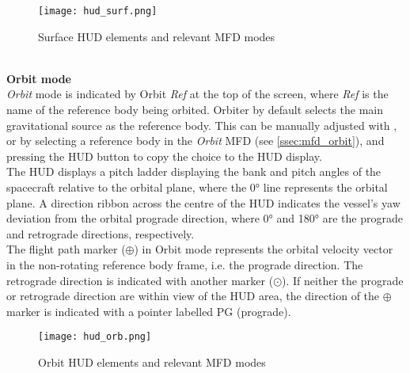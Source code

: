 \documentclass[Orbiter User Manual.tex]{subfiles}
\begin{document}
\begin{figure}[H]
  \centering
  \texttt{[image: hud\_surf.png]}
  \caption{Surface HUD elements and relevant MFD modes}
\end{figure}

\noindent
\\
\textbf{Orbit mode}\\
\textit{Orbit} mode is indicated by Orbit \textit{Ref} at the top of the screen, where \textit{Ref} is the name of the reference body being orbited. Orbiter by default selects the main gravitational source as the reference body. This can be manually adjusted with \Ctrl{}, or by selecting a reference body in the \textit{Orbit} MFD (see \ref{ssec:mfd_orbit}), and pressing the HUD button to copy the choice to the HUD display.\\
The HUD displays a pitch ladder displaying the bank and pitch angles of the spacecraft relative to the orbital plane, where the 0° line represents the orbital plane. A direction ribbon across the centre of the HUD indicates the vessel's yaw deviation from the orbital prograde direction, where 0° and 180° are the prograde and retrograde directions, respectively.\\
The flight path marker ($\oplus$) in Orbit mode represents the orbital velocity vector in the non-rotating reference body frame, i.e. the prograde direction. The retrograde direction is indicated with another marker ($\odot$). If neither the prograde or retrograde direction are within view of the HUD area, the direction of the $\oplus$ marker is indicated with a pointer labelled PG (prograde).

\begin{figure}[H]
  \centering
  \texttt{[image: hud\_orb.png]}
  \caption{Orbit HUD elements and relevant MFD modes}
\end{figure}
\end{document}
